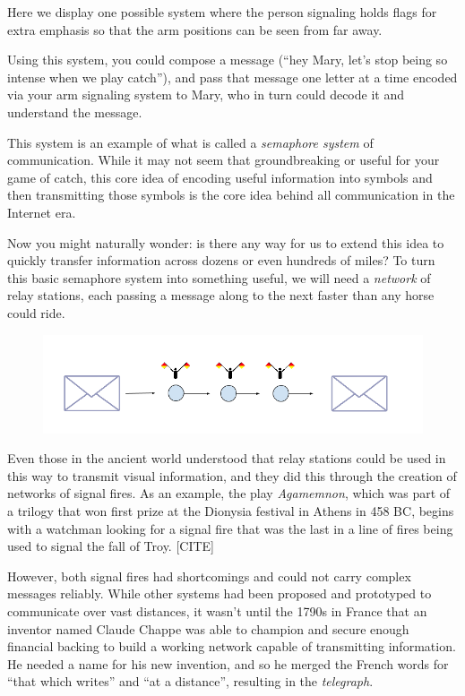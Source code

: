 \documentclass[UTF8]{book}
\begin{document}
\begin{CJK}{UTF8}{gbsn}
Here we display one possible system where the person signaling holds flags for extra emphasis so that the arm positions can be seen from far away.

Using this system, you could compose a message (``hey Mary, let's stop being so intense when we play catch''), and pass that message one letter at a time encoded via your arm signaling system to Mary, who in turn could decode it and understand the message.

This system is an example of what is called a \emph{semaphore system} of communication. While it may not seem that groundbreaking or useful for your game of catch, this core idea of encoding useful information into symbols and then transmitting those symbols is the core idea behind all communication in the Internet era.

Now you might naturally wonder: is there any way for us to extend this idea to quickly transfer information across dozens or even hundreds of miles? To turn this basic semaphore system into something useful, we will need a \emph{network} of relay stations, each passing a message along to the next faster than any horse could ride.

\begin{figure}[H]
\centering
\includegraphics[width=0.9\linewidth]{relay_stations}
\end{figure}

Even those in the ancient world understood that relay stations could be used in this way to transmit visual information, and they did this through the creation of networks of signal fires. As an example, the play \emph{Agamemnon}, which was part of a trilogy that won first prize at the Dionysia festival in Athens in 458 BC, begins with a watchman looking for a signal fire that was the last in a line of fires being used to signal the fall of Troy. [CITE]

However, both signal fires had shortcomings and could not carry complex messages reliably. While other systems had been proposed and prototyped to communicate over vast distances, it wasn't until the 1790s in France that an inventor named Claude Chappe was able to champion and secure enough financial backing to build a working network capable of transmitting information. He needed a name for his new invention, and so he merged the French words for ``that which writes'' and ``at a distance'', resulting in the \emph{telegraph}.


\end{CJK}
\end{document}
